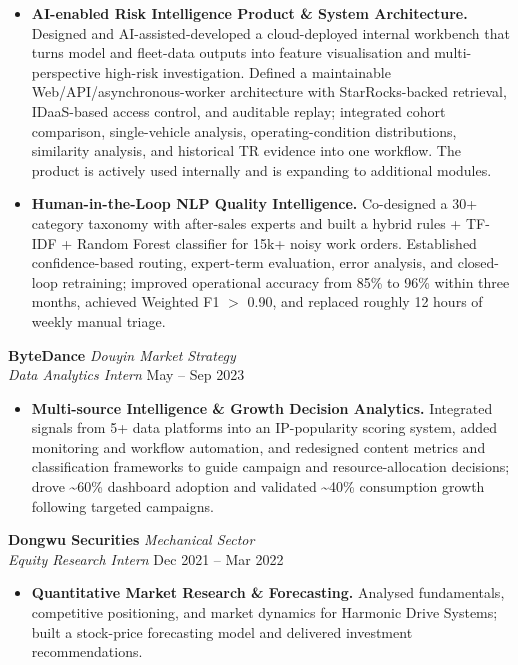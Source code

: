 \documentclass[a4paper,10pt]{article}
\begin{document}
\begin{itemize}
\item \textbf{AI-enabled Risk Intelligence Product \& System Architecture.} Designed and AI-assisted-developed a cloud-deployed internal workbench that turns model and fleet-data outputs into feature visualisation and multi-perspective high-risk investigation. Defined a maintainable Web/API/asynchronous-worker architecture with StarRocks-backed retrieval, IDaaS-based access control, and auditable replay; integrated cohort comparison, single-vehicle analysis, operating-condition distributions, similarity analysis, and historical TR evidence into one workflow. The product is actively used internally and is expanding to additional modules.
\item \textbf{Human-in-the-Loop NLP Quality Intelligence.} Co-designed a 30+ category taxonomy with after-sales experts and built a hybrid rules + TF-IDF + Random Forest classifier for 15k+ noisy work orders. Established confidence-based routing, expert-term evaluation, error analysis, and closed-loop retraining; improved operational accuracy from 85\% to 96\% within three months, achieved Weighted F1 $>$ 0.90, and replaced roughly 12 hours of weekly manual triage.
\end{itemize}
\vspace{1pt}
\noindent\textbf{ByteDance} \hfill \textit{Douyin Market Strategy}\\
\textit{Data Analytics Intern} \hfill May -- Sep 2023
\begin{itemize}
\item \textbf{Multi-source Intelligence \& Growth Decision Analytics.} Integrated signals from 5+ data platforms into an IP-popularity scoring system, added monitoring and workflow automation, and redesigned content metrics and classification frameworks to guide campaign and resource-allocation decisions; drove \textasciitilde60\% dashboard adoption and validated \textasciitilde40\% consumption growth following targeted campaigns.
\end{itemize}
\vspace{1pt}
\noindent\textbf{Dongwu Securities} \hfill \textit{Mechanical Sector}\\
\textit{Equity Research Intern} \hfill Dec 2021 -- Mar 2022
\begin{itemize}\item \textbf{Quantitative Market Research \& Forecasting.} Analysed fundamentals, competitive positioning, and market dynamics for Harmonic Drive Systems; built a stock-price forecasting model and delivered investment recommendations.\end{itemize}
\end{document}
